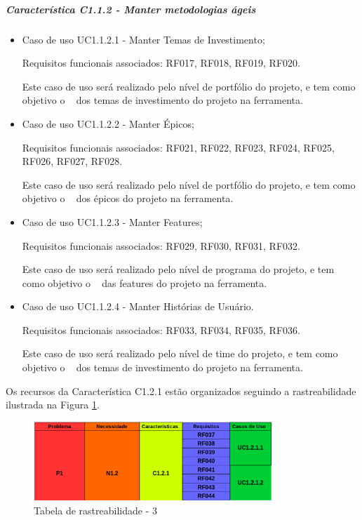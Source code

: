 	\subparagraph{Característica C1.1.2 - Manter metodologias ágeis}
		\begin{itemize}
			
			\item Caso de uso UC1.1.2.1 - Manter Temas de Investimento;
				
				Requisitos funcionais associados: RF017, RF018, RF019, RF020.

				Este caso de uso será realizado pelo nível de portfólio do projeto, e tem como objetivo o \CRUD~ dos temas de investimento do projeto na ferramenta.
			
			\item Caso de uso UC1.1.2.2 - Manter Épicos;
				
				Requisitos funcionais associados: RF021, RF022, RF023, RF024, RF025, RF026, RF027, RF028.

				Este caso de uso será realizado pelo nível de portfólio do projeto, e tem como objetivo o \CRUD~ dos épicos do projeto na ferramenta.
			
			\item Caso de uso UC1.1.2.3 - Manter Features;
				
				Requisitos funcionais associados: RF029, RF030, RF031, RF032.

				Este caso de uso será realizado pelo nível de programa do projeto, e tem como objetivo o \CRUD~ das features do projeto na ferramenta.
			
			\item Caso de uso UC1.1.2.4 - Manter Histórias de Usuário.
				
				Requisitos funcionais associados: RF033, RF034, RF035, RF036.

				Este caso de uso será realizado pelo nível de time do projeto, e tem como objetivo o \CRUD~ dos temas de investimento do projeto na ferramenta.
		\end{itemize}

Os recursos da Característica C1.2.1 estão organizados seguindo a rastreabilidade ilustrada na Figura \ref{img:tabelaParte3}.

\begin{figure}[H]
	\centering
	\includegraphics[width=0.8\textwidth]{imgModelagem/tabelaParte3}
	\caption{Tabela de rastreabilidade - 3 }
	\label{img:tabelaParte3}
\end{figure}

